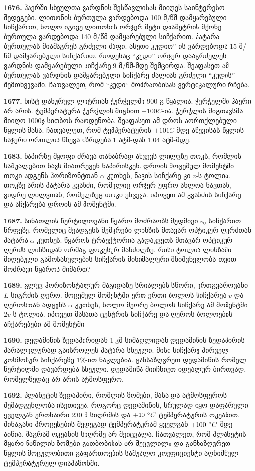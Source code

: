 \documentclass[12pt,a4paper,]{report}
\begin{document}
\textbf{1676.} ჰაერში სხეულთა ვარდნის შესწავლისას მიიღეს საინტერესო შედეგები. ლითონის ბურთულა ვარდებოდა 100 მ/წმ დამყარებული სიჩქარით, ხოლო იგივე ლითონის  ორჯერ მეტი დიამეტრის მქონე ბურთულა ვარდებოდა 140 მ/წმ დამყარებული სიჩქარით. პატარა ბურთულას მიამაგრეს გრძელი ძაფი. ასეთი კუდით” ის ვარდებოდა 15 მ/წმ დამყარებული სიჩქარით. როდესაც “კუდი” ორჯერ დააგრძელეს, ვარდნის დამყარებული სიჩქარე 9 მ/წმ-მდე შემცირდა.  შეაფასეთ ამ ბურთულას ვარდნის  დამყარებული სიჩქარე ძალიან გრძელი “კუდის” შემთხვევაში. ჩათვალეთ, რომ “კუდი” მოძრაობისას ვერტიკალური რჩება. 

\textbf{1677.} ხისტ დახურულ ლიტრიან ჭურჭელში 900 გ წყალია. ჭურჭელში ჰაერი არ არის. ტემპერატურა ჭურჭლის შიგნით $+100 C$-ია. ჭურჭლის შიგთავსმა მიიღო 1000ჯ სითბოს რაოდენობა. შეაფასეთ ამ დროს აორთქლებული წყლის მასა. ჩათვალეთ, რომ ტემპერატურის $+101 C$-მდე აწევისას წყლის ნაჯერი ორთლის წნევა იზრდება 1 ატმ-დან 1.04 ატმ-მდე.

\textbf{1683.} ნაპირზე მყოფი ძრავა თანაბრად ახვევს ლილვზე თოკს, რომლის საშუალებით ნავს მიათრევენ ნაპირისკენ. დროის მოცემულ მომენტში თოკი ადგენს ჰორიზონტთან $\alpha$ კუთხეს, ნავის სიჩქარე კი $v$-ს ტოლია. თოკზე არის პატარა კვანძი, რომელიც ორჯერ უფრო ახლოა ნავთან, ვიდრე ლილვთან, რომელზეც თოკი ეხვევა. იპოვეთ ამ კვანძის სიჩქარე და აჩქარება დროის ამ მომენტში. 

\textbf{1687.} სინათლის წერტილოვანი წყარო მოძრაობს მუდმივი $v_0$ სიჩქარით წრფეზე, რომელიც შეადგენს შემკრები ლინზის მთავარ ოპტიკურ ღერძთან  პატარა $\alpha$ კუთხეს. წყაროს ტრაექტორია გადაკვეთს მთავარ ოპტიკურ ღერძს ლინზიდან ორმაგ ფოკუსურ მანძილზე. რისი ტოლია ლინზაში მიღებული გამოსახულების სიჩქარის მინიმალური მნიშვნელობა თვით მოძრავი წყაროს მიმართ?

\textbf{1689.} გლუვ ჰორიზონტალურ მაგიდაზე სრიალებს სწორი, ერთგვაროვანი $L$ სიგრძის ღერო. მოცემულ მომენტში ერთ-ერთი ბოლოს სიჩქარეა $v$ და ღეროსთან ადგენს $\alpha$ კუთხეს, ხოლო მეორე ბოლოს სიჩქარე ამ მომენტში $2v$-ს ტოლია. იპოვეთ მასათა ცენტრის სიჩქარე და ღეროს ბოლოების აჩქარებები ამ მომენტში. 

\textbf{1690.} დედამიწის ზედაპირიდან 1 კმ სიმაღლიდან დედამიწის ზედაპირის პარალელურად გაისროლეს პატარა სხეული. მისი სიჩქარე პირველ კოსმოსურ სიჩქარეზე 1$\%$-ით ნაკლებია. განსაზღვრეთ დედამიწის რომელ წერტილში დავარდება სხეული. დედამიწა მიიჩნიეთ იდეალურ ბირთვად, რომელზედაც არ არის ატმოსფერო. 

\textbf{1692.} პლანეტის ზედაპირი, რომლის ზომები, მასა და ატმოსფეროს შემადგენლობა ისეთივეა, როგორც დედამიწის, სრულად იყო დაფარული ყველგან ერთნაირი 230 მ სიღრმის და $+10\ \degree C$ ტემპერატურის ოკეანით. შინაგანი პროცესების შედეგად ტემპერატურამ ყველგან $+100\ \degree C$-მდე აიწია, მაგრამ ოკეანის სიღრმე არ შეიცვალა. ჩათვალეთ, რომ პლანეტის მყარი ნაწილის ზომები გათბობისას არ შეცვლილა და განსაზღვრეთ წყლის მოცულობითი გაფართოების საშუალო კოეფიციენტი აღნიშნულ ტემპერატურულ დიაპაზონში.
\end{document}
